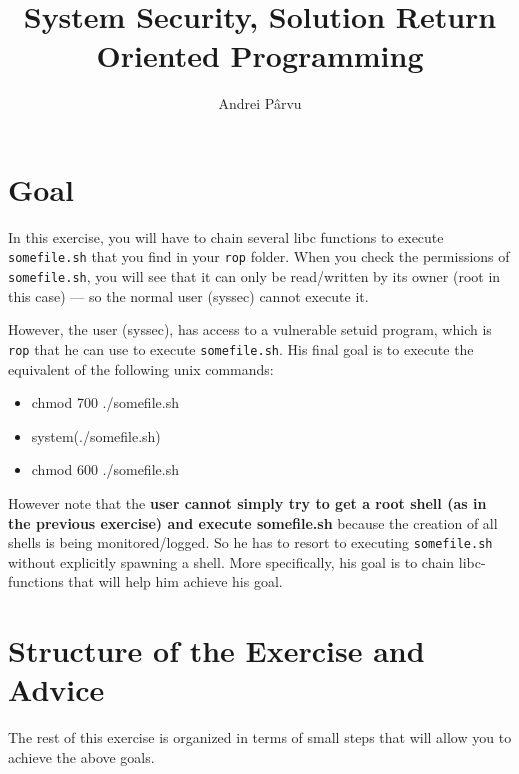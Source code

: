 \documentclass[a4paper,11pt]{article}
\title{System Security,
\ifsolution Solution \else \fi
Return Oriented Programming}
\author{Andrei Pârvu}
\begin{document}
\maketitle

\section{Goal}
In this exercise, you will have to chain several libc functions
to execute \texttt{somefile.sh} that you find in your \texttt{rop} folder. 
When you check the permissions of \texttt{somefile.sh}, you will see that it
can only be read/written by its owner (root in this case) --- so the normal user
(syssec) cannot execute it. 

However, the user (syssec), has access to a vulnerable setuid program, which is
\texttt{rop} that he can use to execute \texttt{somefile.sh}. His final goal is
to execute the equivalent of the following unix commands:

\begin{itemize}
\item chmod 700 ./somefile.sh
\item system(./somefile.sh)
\item chmod 600 ./somefile.sh
\end{itemize}

However note that the \textbf{user cannot simply try to get a root shell (as in the
previous exercise) and execute somefile.sh} because the creation of all shells is
being monitored/logged. So he has to resort to executing \texttt{somefile.sh}
without explicitly spawning a shell. More specifically, his goal is to chain
libc-functions that will help him achieve his goal.

\section*{Structure of the Exercise and Advice}
The rest of this exercise is organized in terms of small steps that will allow
you to achieve the above goals.
\end{document}

